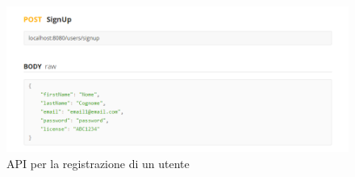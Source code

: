 \begin{figure}[htbp]
    \includegraphics[width=\textwidth]{images/iterazione1/postman-api/SignUP.PNG}
    \centering
    \caption{API per la registrazione di un utente}
    \label{signup}
\end{figure}


\cleardoublepage 




